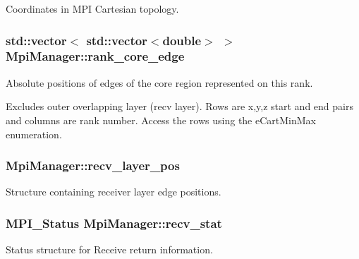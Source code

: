 Coordinates in M\+PI Cartesian topology. 

\subsubsection[{\texorpdfstring{rank\+\_\+core\+\_\+edge}{rank_core_edge}}]{\setlength{\rightskip}{0pt plus 5cm}std\+::vector$<$ std\+::vector$<$double$>$ $>$ Mpi\+Manager\+::rank\+\_\+core\+\_\+edge}\hypertarget{class_mpi_manager_a0211cd784c9ed1514d5968599e794313}{}\label{class_mpi_manager_a0211cd784c9ed1514d5968599e794313}


Absolute positions of edges of the core region represented on this rank. 

Excludes outer overlapping layer (recv layer). Rows are x,y,z start and end pairs and columns are rank number. Access the rows using the e\+Cart\+Min\+Max enumeration. 
\subsubsection[{\texorpdfstring{recv\+\_\+layer\+\_\+pos}{recv_layer_pos}}]{ Mpi\+Manager\+::recv\+\_\+layer\+\_\+pos}\hypertarget{class_mpi_manager_ad1ff57a97ec56efc1690dd3a5a52fd64}{}\label{class_mpi_manager_ad1ff57a97ec56efc1690dd3a5a52fd64}


Structure containing receiver layer edge positions. 

\subsubsection[{\texorpdfstring{recv\+\_\+stat}{recv_stat}}]{\setlength{\rightskip}{0pt plus 5cm}M\+P\+I\+\_\+\+Status Mpi\+Manager\+::recv\+\_\+stat}\hypertarget{class_mpi_manager_a257bc27e8099f1cbf5ac70b80d8eadaa}{}\label{class_mpi_manager_a257bc27e8099f1cbf5ac70b80d8eadaa}


Status structure for Receive return information. 


